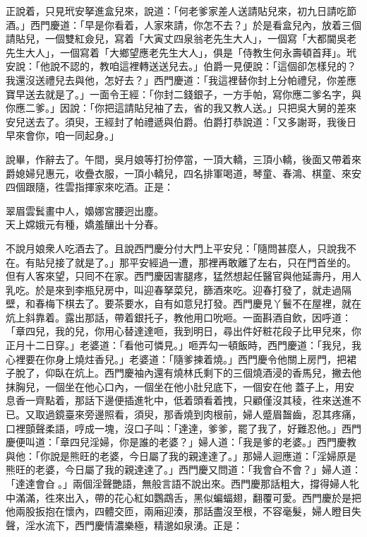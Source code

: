 正說着，只見玳安拏進盒兒來，說道：「何老爹家差人送請貼兒來，初九日請吃節酒。」西門慶道：「早是你看着，人家來請，你怎不去？」於是看盒兒內，放着三個請貼兒，一個雙紅僉兒，寫着「大寅丈四泉翁老先生大人」，一個寫「大都閫吳老先生大人」，一個寫着「大鄉望應老先生大人」，俱是「侍教生何永壽頓首拜」。玳安說：「他說不認的，教咱這裡轉送送兒去。」伯爵一見便說：「這個卻怎樣兒的？我還沒送禮兒去與他，怎好去？」西門慶道：「我這裡替你封上分帕禮兒，你差應寶早送去就是了。」一面令王經：「你封二錢銀子，一方手帕，寫你應二爹名字，與你應二爹。」因說：「你把這請貼兒袖了去，省的我又教人送。」只把吳大舅的差來安兒送去了。須臾，王經封了帕禮遞與伯爵。伯爵打恭說道：「又多謝哥，我後日早來會你，咱一同起身。」

說畢，作辭去了。午間，吳月娘等打扮停當，一頂大轎，三頂小轎，後面又帶着來爵媳婦兒惠元，收疊衣服，一頂小轎兒，四名排軍喝道，琴童、春鴻、棋童、來安四個跟隨，徃雲指揮家來吃酒。正是：

\begin{myquote}
翠眉雲鬂畫中人，嬝娜宮腰迥出塵。\\天上嫦娥元有種，嬌羞釀出十分春。
\end{myquote}

不說月娘衆人吃酒去了。且說西門慶分付大門上平安兒：「隨問甚麼人，只說我不在。有貼兒接了就是了。」那平安經過一遭，那裡再敢離了左右，只在門首坐的。但有人客來望，只囘不在家。西門慶因害腿疼，猛然想起任醫官與他延壽丹，用人乳吃。{}於是來到李瓶兒房中，叫迎春拏菜兒，篩酒來吃。迎春打發了，就走過隔壁，和春梅下棋去了。要茶要水，自有如意兒打發。西門慶見丫鬟不在屋裡，就在炕上斜靠着。露出那話，帶着銀托子，教他用口吮咂。一面斟酒自飲，因呼道：「章四兒，我的兒，你用心替達達咂，我到明日，尋出件好粧花段子比甲兒來，你正月十二日穿。」老婆道：「看他可憐見。」咂弄勾一頓飯時，西門慶道：「我兒，我心裡要在你身上燒炷香兒。」老婆道：「隨爹揀着燒。」西門慶令他關上房門，把裙子脫了，仰臥在炕上。西門慶袖內還有燒林氏剩下的三個燒酒浸的香馬兒，撇去他抹胸兒，一個坐在他心口內，一個坐在他小肚兒底下，一個安在他𣭈蓋子上，用安息香一齊點着，那話下邊便插進牝中，低着頭看着拽，只顧僅沒其稜，徃來送進不已。又取過鏡臺來旁邊照看，{}須臾，那香燒到肉根前，婦人蹙眉齧齒，忍其疼痛，口裡顫聲柔語，哼成一塊，沒口子叫：「達達，爹爹，罷了我了，好難忍他。」西門慶便叫道：「章四兒淫婦，你是誰的老婆？」婦人道：「我是爹的老婆。」西門慶教與他：「你說是熊旺的老婆，今日屬了我的親達達了。」{}那婦人迴應道：「淫婦原是熊旺的老婆，今日屬了我的親達達了。」西門慶又問道：「我會㒲不會？」婦人道：「達達會㒲𣭈。」兩個淫聲艷語，無般言語不說出來。西門慶那話粗大，撐得婦人牝中滿滿，徃來出入，帶的花心紅如鸚鵡舌，黑似蝙蝠翅，翻覆可愛。西門慶於是把他兩股扳抱在懷內，四體交匝，兩廂迎湊，那話盡沒至根，不容毫髮，婦人瞪目失聲，淫水流下，西門慶情濃樂極，精邈如泉湧。正是：


